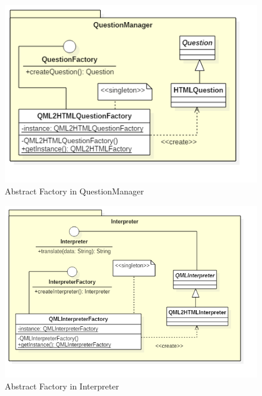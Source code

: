 \begin{itemize}
	\begin{figure}[h!]
	\begin{center}
		\includegraphics[scale=0.6]{../images/QuestionManagerClassDesignPattern.png}
		\caption{Abstract Factory in QuestionManager}
	\end{center}
	\end{figure}
	\begin{figure}[h!]
	\begin{center}
		\includegraphics[scale=0.5]{../images/interpreterClass.png}
		\caption{Abstract Factory in Interpreter}
	\end{center}
	\end{figure}
	\end{itemize}
	
